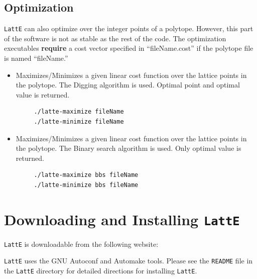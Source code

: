 \documentclass{article}
\newcommand{\latte}{{\tt LattE}\xspace}
\begin{document}
\subsection{Optimization}


\latte can also optimize over the integer points of a polytope. However, this part of the software is not as stable as the rest of the code. The optimization executables {\bf require} a cost vector specified in ``fileName.cost'' if the polytope file is named ``fileName.''

\begin{itemize}
\item Maximizes/Minimizes a given linear cost function over the lattice
  points in the polytope. The Digging algorithm
  \cite{latte3} is used. Optimal point and optimal value is returned. 
\begin{verbatim}
     ./latte-maximize fileName
     ./latte-minimize fileName
\end{verbatim} 
\item Maximizes/Minimizes a given linear cost function over the lattice
  points in the polytope. The Binary search
  algorithm is used. Only optimal value is returned. 
\begin{verbatim}
     ./latte-maximize bbs fileName
     ./latte-minimize bbs fileName
\end{verbatim} 
\end{itemize}




\section{Downloading and Installing {\tt LattE}}

{\tt LattE} is downloadable from the following website:




\latte uses the GNU Autoconf and Automake tools. Please see the {\tt README} file in the \latte directory for detailed directions for installing \latte.
\end{document}
